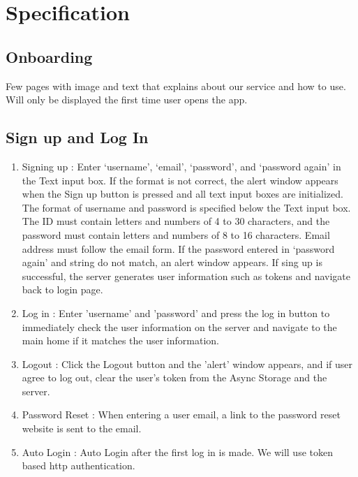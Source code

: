 \documentclass[conference]{IEEEtran}
\begin{document}
\section{Specification}
\subsection{Onboarding} Few pages with image and text that explains about our service and how to use. Will only be displayed the first time user opens the app.

\subsection{Sign up and Log In}
\begin{enumerate}
    \item Signing up : Enter ‘username’, ‘email’, ‘password’, and ‘password again’ in the Text input box. If the format is not correct, the alert window appears when the Sign up button is pressed and all text input boxes are initialized. The format of username and password is specified below the Text input box. The ID must contain letters and numbers of 4 to 30 characters, and the password must contain letters and numbers of 8 to 16 characters. Email address must follow the email form. If the password entered in ‘password again’ and string do not match, an alert window appears. If sing up is successful, the server generates user information such as tokens and navigate back to login page.
    \item Log in : Enter 'username' and 'password' and press the log in button to immediately check the user information on the server and navigate to the main home if it matches the user information.
    \item Logout : Click the Logout button and the 'alert' window appears, and if user agree to log out, clear the user's token from the Async Storage and the server.
    \item Password Reset : When entering a user email, a link to the password reset website is sent to the email.
    \item Auto Login : Auto Login after the first log in is made. We will use token based http authentication.
\end{enumerate}
\end{document}
